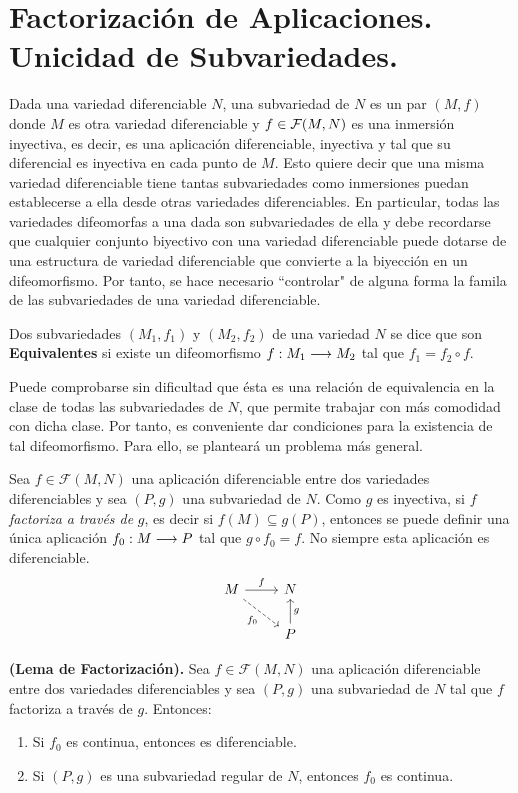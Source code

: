 \documentclass[Cursovd_portada.tex]{subfiles}
\begin{document}
\section{Factorización de Aplicaciones. Unicidad de Subvariedades.}
\hs Dada una variedad diferenciable $N$, una subvariedad de $N$ es un par $(M,f)$ donde $M$ es otra variedad
diferenciable y $f\in{\cal F}(M,N)$ es una inmersión inyectiva, es decir, es una aplicación diferenciable,
inyectiva y tal que su diferencial es inyectiva en cada punto de $M$. Esto quiere decir que una misma variedad
diferenciable tiene tantas subvariedades como inmersiones puedan establecerse a ella desde otras variedades
diferenciables. En particular, todas las variedades difeomorfas a una dada son subvariedades de ella y debe
recordarse que cualquier conjunto biyectivo con una variedad diferenciable puede dotarse de una estructura de
variedad diferenciable que convierte a la biyección en un difeomorfismo. Por tanto, se hace necesario ``controlar"
de alguna forma la famila de las subvariedades de una variedad diferenciable.
\begin{defi}
Dos subvariedades $(M_1,f_1)$ y $(M_2,f_2)$ de una variedad $N$ se
dice que son {\bf Equivalentes} si existe un difeomorfismo
$f:M_1\longrightarrow M_2$ tal que $f_1=f_2\circ f$.
\end{defi}
\hs Puede comprobarse sin dificultad que ésta es una
relación de equivalencia en la clase de todas las
subvariedades de $N$, que permite trabajar con más comodidad
con dicha clase. Por tanto, es conveniente dar condiciones para la
existencia de tal difeomorfismo. Para ello, se planteará un
problema más general.

Sea $f\in\mathcal{F}(M,N)$ una aplicación diferenciable entre
dos variedades diferenciables y sea $(P,g)$ una subvariedad de
$N$. Como $g$ es inyectiva, si $f$ {\it factoriza a través de}
$g$, es decir si $f(M)\subseteq g(P)$, entonces se puede definir
una única aplicación $f_0:M\longrightarrow P$ tal que $g\circ f_0=f$.
No siempre esta aplicación es diferenciable.
\[
\begin{tikzcd}
M\arrow[r, rightarrow,  "f"]\arrow[dr, dashrightarrow, "f_0"'] & N\\
 & P \arrow[u, rightarrow, "g"']
\end{tikzcd}
\]
\begin{teorema}
{\bf (Lema de Factorización).} Sea $f\in\mathcal{F}(M,N)$ una
aplicación diferenciable entre dos variedades diferenciables y
sea $(P,g)$ una subvariedad de $N$ tal que $f$ factoriza a
través de $g$. Entonces:
\begin{enumerate}
\item Si $f_0$ es continua, entonces es diferenciable. \item Si
$(P,g)$ es una subvariedad regular de $N$, entonces $f_0$ es
continua.
\end{enumerate}
\end{teorema}
\end{document}
